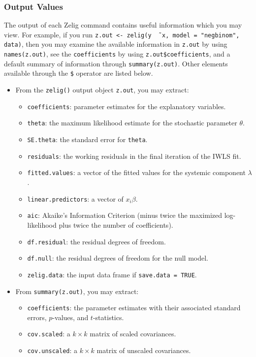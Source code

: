 \subsubsection{Output Values}

The output of each Zelig command contains useful information which you
may view.  For example, if you run \texttt{z.out <- zelig(y \~\,
  x, model = "negbinom", data)}, then you may examine the available
information in \texttt{z.out} by using \texttt{names(z.out)},
see the {\tt coefficients} by using {\tt z.out\$coefficients}, and
a default summary of information through \texttt{summary(z.out)}.
Other elements available through the {\tt \$} operator are listed
below.

\begin{itemize}
\item From the {\tt zelig()} output object {\tt z.out}, you may extract:
   \begin{itemize}
   \item {\tt coefficients}: parameter estimates for the explanatory
     variables.
   \item {\tt theta}: the maximum likelihood estimate for the
     stochastic parameter $\theta$.  
   \item {\tt SE.theta}: the standard error for {\tt theta}.  
   \item {\tt residuals}: the working residuals in the final iteration
     of the IWLS fit.
   \item {\tt fitted.values}: a vector of the fitted values for the systemic
     component $\lambda$.  
   \item {\tt linear.predictors}: a vector of $x_{i} \beta$.  
   \item {\tt aic}: Akaike's Information Criterion (minus twice the
     maximized log-likelihood plus twice the number of coefficients).
   \item {\tt df.residual}: the residual degrees of freedom.
   \item {\tt df.null}: the residual degrees of freedom for the null
     model.
   \item {\tt zelig.data}: the input data frame if {\tt save.data = TRUE}.  
   \end{itemize}

\item From {\tt summary(z.out)}, you may extract: 
   \begin{itemize}
   \item {\tt coefficients}: the parameter estimates with their
     associated standard errors, $p$-values, and $t$-statistics.
   \item{\tt cov.scaled}: a $k \times k$ matrix of scaled covariances.
   \item{\tt cov.unscaled}: a $k \times k$ matrix of unscaled
     covariances.  
   \end{itemize}


\end{itemize}
